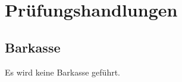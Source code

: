 \documentclass[%
	titlepage,oneside,12pt,headlines=1.5,numbers=noenddot, chapterprefix=false,parskip=full-,DIV=14,pagesize]{scrreprt}
\begin{document}
\chapter{Prüfungshandlungen}
\section{Barkasse}
Es wird keine Barkasse geführt. %



\end{document}
